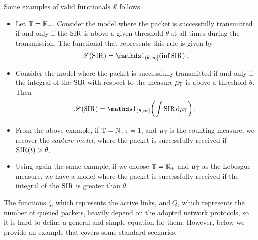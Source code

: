 \begin{example}
Some examples of valid functionals $\mathscr{S}$ follows.
\begin{itemize}[itemsep=3pt,parsep=3pt,topsep=3pt,partopsep=3pt]
    \item Let ${\mathbb T}={\mathbb R}_+$. Consider the model where the packet is successfully transmitted if and only if the $\mathrm{SIR}$ is above a given threshold $\theta$ at all times during the transmission. The functional that represents this rule is given by
    \begin{align*}
        \mathscr{S}(\SIR) = \ind_{(\theta,\infty]}\!\left(\inf \SIR\right).
    \end{align*}
    
    \item Consider the model where the packet is successfully transmitted if and only if the integral of the $\mathrm{SIR}$ with respect to the measure $\mu_{\mathbb T}$ is above a threshold $\theta$. Then
    \begin{align*}
        \mathscr{S}(\SIR) = \ind_{(\theta,\infty]}\!\left( \int \SIR\,\d\mu_\T \right). %
    \end{align*}
    
    \item From the above example, if ${\mathbb T}={\mathbb N}$, $\tau=1$, and $\mu_{\mathbb T}$ is the counting measure, we recover the \textit{capture model}, where the packet is successfully received if $\mathrm{SIR}(t) > \theta$.
    
    \item Using again the same example, if we choose ${\mathbb T}={\mathbb R}_+$ and $\mu_{\mathbb T}$ as the Lebesgue measure, we have a model where the packet is successfully received if the integral of the $\mathrm{SIR}$ is greater than $\theta$.
\end{itemize}
\end{example}

The functions $\zeta$, which represents the active links, and $Q$, which represents the number of queued packets, heavily depend on the adopted network protocols, so it is hard to define a general and simple equation for them.
%
However, below we provide an example that covers some standard scenarios.

